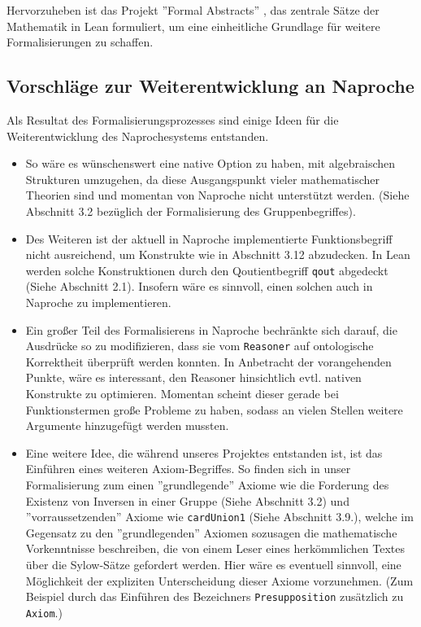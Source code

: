 \documentclass[a4paper,12pt]{scrartcl}
\begin{document}
Hervorzuheben ist das Projekt ''Formal Abstracts'' \cite{bibtex.b}, das zentrale Sätze der Mathematik in Lean formuliert, um eine einheitliche Grundlage für weitere Formalisierungen zu schaffen.

\subsection{Vorschläge zur Weiterentwicklung an Naproche}

Als Resultat des Formalisierungsprozesses sind einige Ideen für die Weiterentwicklung des Naprochesystems entstanden.

\begin{itemize}
\item So wäre es wünschenswert eine native Option zu haben, mit algebraischen Strukturen umzugehen, da diese Ausgangspunkt vieler mathematischer Theorien sind und momentan von Naproche nicht unterstützt werden. (Siehe Abschnitt 3.2 bezüglich der Formalisierung des Gruppenbegriffes).

\item Des Weiteren ist der aktuell in Naproche implementierte Funktionsbegriff nicht ausreichend, um Konstrukte wie in Abschnitt 3.12 abzudecken. In Lean werden solche Konstruktionen durch den Qoutientbegriff \verb!qout! abgedeckt (Siehe Abschnitt 2.1). Insofern wäre es sinnvoll, einen solchen auch in Naproche zu implementieren.

\item Ein großer Teil des Formalisierens in Naproche bechränkte sich darauf, die Ausdrücke so zu modifizieren, dass sie vom \verb!Reasoner! auf ontologische Korrektheit überprüft werden konnten. In Anbetracht der vorangehenden Punkte, wäre es interessant, den Reasoner hinsichtlich evtl. nativen Konstrukte zu optimieren. Momentan scheint dieser gerade bei Funktionstermen große Probleme zu haben, sodass an vielen Stellen weitere Argumente hinzugefügt werden mussten.

\item Eine weitere Idee, die während unseres Projektes entstanden ist, ist das Einführen eines weiteren Axiom-Begriffes. So finden sich in unser Formalisierung zum einen ''grundlegende'' Axiome wie die Forderung des Existenz von Inversen in einer Gruppe (Siehe Abschnitt 3.2) und ''vorraussetzenden'' Axiome wie \verb!cardUnion1! (Siehe Abschnitt 3.9.), welche im Gegensatz zu den ''grundlegenden'' Axiomen sozusagen die mathematische Vorkenntnisse beschreiben, die von einem Leser eines herkömmlichen Textes über die Sylow-Sätze gefordert werden. Hier wäre es eventuell sinnvoll, eine Möglichkeit der expliziten Unterscheidung dieser Axiome vorzunehmen. (Zum Beispiel durch das Einführen des Bezeichners \verb!Presupposition! zusätzlich zu \verb!Axiom!.)


\end{itemize}
\end{document}

